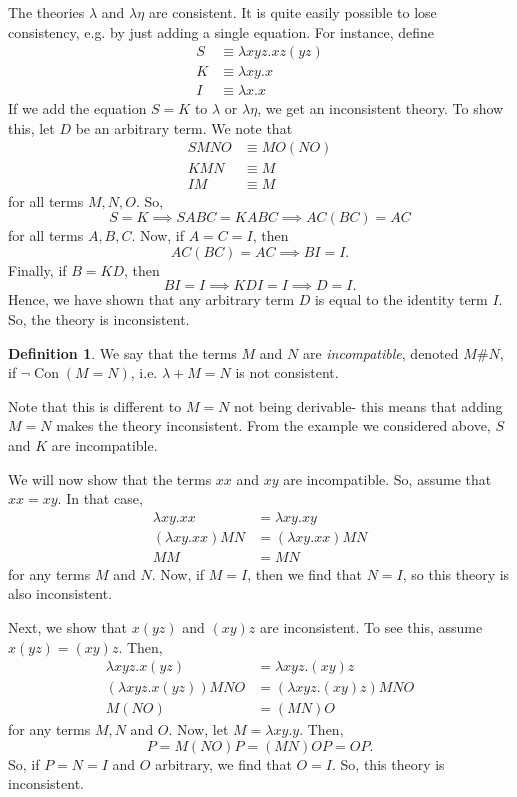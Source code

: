 \documentclass[a4paper, openany]{memoir}
\theoremstyle{definition}
\newtheorem{definition}[proposition]{Definition}
\begin{document}
    The theories $\lambda$ and $\lambda \eta$ are consistent. It is quite easily possible to lose consistency, e.g. by just adding a single equation. For instance, define
    \begin{align*}
        S &\equiv \lambda xyz.xz(yz) \\
        K &\equiv \lambda xy.x \\
        I &\equiv \lambda x.x
    \end{align*}
    If we add the equation $S = K$ to $\lambda$ or $\lambda \eta$, we get an inconsistent theory. To show this, let $D$ be an arbitrary term. We note that
    \begin{align*}
        SMNO &\equiv MO(NO) \\
        KMN &\equiv M \\
        IM &\equiv M
    \end{align*}
    for all terms $M, N, O$. So,
    \[S = K \implies SABC = KABC \implies AC(BC) = AC\]
    for all terms $A, B, C$. Now, if $A = C = I$, then
    \[AC(BC) = AC \implies BI = I.\]
    Finally, if $B = KD$, then
    \[BI = I \implies KDI = I \implies D = I.\]
    Hence, we have shown that any arbitrary term $D$ is equal to the identity term $I$. So, the theory is inconsistent.

    \begin{definition}
        We say that the terms $M$ and $N$ are \emph{incompatible}, denoted $M\#N$, if $\lnot \operatorname{Con}(M = N)$, i.e. $\lambda + M = N$ is not consistent.
    \end{definition}
    \noindent Note that this is different to $M = N$ not being derivable- this means that adding $M = N$ makes the theory inconsistent. From the example we considered above, $S$ and $K$ are incompatible.

    We will now show that the terms $xx$ and $xy$ are incompatible. So, assume that $xx = xy$. In that case,
    \begin{align*}
        \lambda xy.xx &= \lambda xy.xy \\
        (\lambda xy.xx)MN &= (\lambda xy.xx)MN \\
        MM &= MN
    \end{align*}
    for any terms $M$ and $N$. Now, if $M = I$, then we find that $N = I$, so this theory is also inconsistent.

    Next, we show that $x(yz)$ and $(xy)z$ are inconsistent. To see this, assume $x(yz) = (xy)z$. Then,
    \begin{align*}
        \lambda xyz.x(yz) &= \lambda xyz.(xy)z \\
        (\lambda xyz.x(yz)) MNO &= (\lambda xyz.(xy)z) MNO \\
        M(NO) &= (MN)O
    \end{align*}
    for any terms $M, N$ and $O$. Now, let $M = \lambda xy.y$. Then,
    \[P = M(NO)P = (MN)OP = OP.\]
    So, if $P = N = I$ and $O$ arbitrary, we find that $O = I$. So, this theory is inconsistent.
\end{document}
